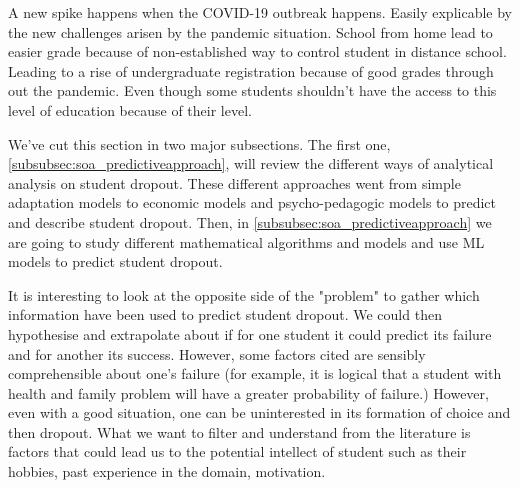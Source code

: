 \documentclass[../../main.tex]{subfiles}
\begin{document}
A new spike happens when the COVID-19 outbreak happens. Easily explicable by the new challenges arisen by the pandemic situation. School from home lead to easier grade because of non-established way to control student in distance school. Leading to a rise of undergraduate registration because of good grades through out the pandemic. Even though some students shouldn't have the access to this level of education because of their level.

We've cut this section in two major subsections. The first one, \ref{subsubsec:soa_predictiveapproach}, will review the different ways of analytical analysis on student dropout. These different approaches went from simple adaptation models to economic models and psycho-pedagogic models to predict and describe student dropout. Then, in \ref{subsubsec:soa_predictiveapproach} we are going to study different mathematical algorithms and models and use ML models to predict student dropout.

It is interesting to look at the opposite side of the "problem" to gather which information have been used to predict student dropout. We could then hypothesise and extrapolate about if for one student it could predict its failure and for another its success.
However, some factors cited are sensibly comprehensible about one's failure (for example, it is logical that a student with health and family problem will have a greater probability of failure.) However, even with a good situation, one can be uninterested in its formation of choice and then dropout. 
What we want to filter and understand from the literature is factors that could lead us to the potential intellect of student such as their hobbies, past experience in the domain, motivation.
\end{document}
